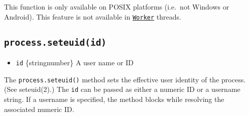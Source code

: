 \begin{Shaded}
\begin{Highlighting}[]
  \OperatorTok{=} \NormalTok{(}\NormalTok{)}\OperatorTok{;}

\NormalTok{ (} \OperatorTok{\&\&} \NormalTok{) \{}
  \NormalTok{(}\SpecialCharTok{$\{}\NormalTok{()}\SpecialCharTok{\}}\VerbatimStringTok{\textasciigrave{}}\NormalTok{)}\OperatorTok{;}
  \NormalTok{ \{}
    \NormalTok{(}\NormalTok{)}\OperatorTok{;}
    \NormalTok{(}\SpecialCharTok{$\{}\NormalTok{()}\SpecialCharTok{\}}\VerbatimStringTok{\textasciigrave{}}\NormalTok{)}\OperatorTok{;}
\NormalTok{  \} }
    \NormalTok{(}\SpecialCharTok{$\{}\SpecialCharTok{\}}\VerbatimStringTok{\textasciigrave{}}\NormalTok{)}\OperatorTok{;}
\NormalTok{  \}}
\NormalTok{\}}
\end{Highlighting}
\end{Shaded}

This function is only available on POSIX platforms (i.e.~not Windows or
Android). This feature is not available in
\href{worker_threads.md\#class-worker}{\texttt{Worker}} threads.

\subsection{\texorpdfstring{\texttt{process.seteuid(id)}}{process.seteuid(id)}}\label{process.seteuidid}

\begin{itemize}
\tightlist
\item
  \texttt{id} \{string\textbar number\} A user name or ID
\end{itemize}

The \texttt{process.seteuid()} method sets the effective user identity
of the process. (See seteuid(2).) The \texttt{id} can be passed as
either a numeric ID or a username string. If a username is specified,
the method blocks while resolving the associated numeric ID.

